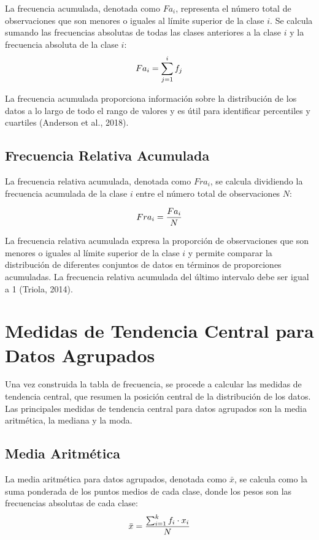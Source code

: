 \documentclass[
  spanish,
  letterpaper,
]{book}
\begin{document}
La frecuencia acumulada, denotada como \(Fa_i\)\hspace{0pt}, representa
el número total de observaciones que son menores o iguales al límite
superior de la clase \(i\). Se calcula sumando las frecuencias absolutas
de todas las clases anteriores a la clase \(i\) y la frecuencia absoluta
de la clase \(i\): \[\huge Fa_i = \sum_{j=1}^{i} f_j\]

La frecuencia acumulada proporciona información sobre la distribución de
los datos a lo largo de todo el rango de valores y es útil para
identificar percentiles y cuartiles (Anderson et al., 2018).

\subsection{Frecuencia Relativa
Acumulada}\label{frecuencia-relativa-acumulada}

La frecuencia relativa acumulada, denotada como \(Fra_i\)\hspace{0pt},
se calcula dividiendo la frecuencia acumulada de la clase \(i\) entre el
número total de observaciones \(N\):

\[\huge Fra_i = \frac{Fa_i}{N}\]

La frecuencia relativa acumulada expresa la proporción de observaciones
que son menores o iguales al límite superior de la clase \(i\) y permite
comparar la distribución de diferentes conjuntos de datos en términos de
proporciones acumuladas. La frecuencia relativa acumulada del último
intervalo debe ser igual a 1 (Triola, 2014).

\section{Medidas de Tendencia Central para Datos
Agrupados}\label{medidas-de-tendencia-central-para-datos-agrupados}

Una vez construida la tabla de frecuencia, se procede a calcular las
medidas de tendencia central, que resumen la posición central de la
distribución de los datos. Las principales medidas de tendencia central
para datos agrupados son la media aritmética, la mediana y la moda.

\subsection{Media Aritmética}\label{media-aritmuxe9tica-2}

La media aritmética para datos agrupados, denotada como \(\bar{x}\), se
calcula como la suma ponderada de los puntos medios de cada clase, donde
los pesos son las frecuencias absolutas de cada clase:
\[\huge \bar{x} = \frac{\sum_{i=1}^{k} f_i \cdot x_i}{N}\]
\end{document}
